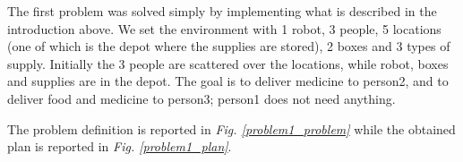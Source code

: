 The first problem was solved simply by implementing what is described in the introduction above.
We set the environment with 1 robot, 3 people, 5 locations (one of which is the depot where the supplies are stored), 2 boxes and 3 types of supply.
Initially the 3 people are scattered over the locations, while robot, boxes and supplies are in the depot.
The goal is to deliver medicine to person2, and to deliver food and medicine to person3; person1 does not need anything.

The problem definition is reported in \textit{Fig. \ref{problem1_problem}} while the obtained plan is reported in \textit{Fig. \ref{problem1_plan}}.